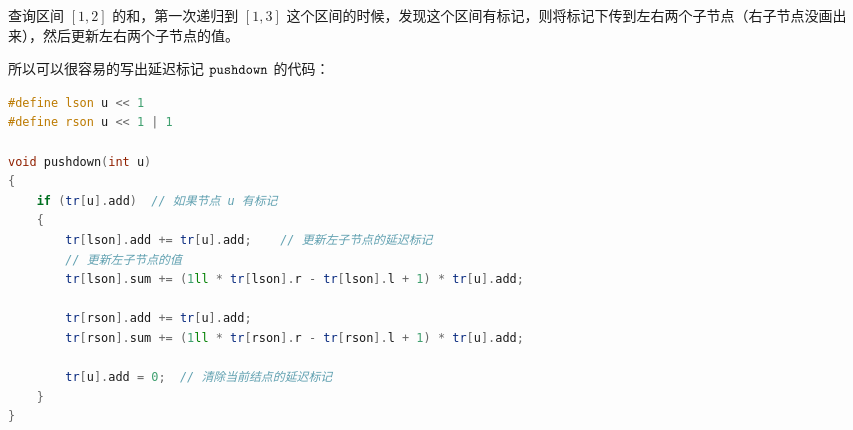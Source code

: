 查询区间 $[1, 2]$ 的和，第一次递归到 $[1, 3]$ 这个区间的时候，发现这个区间有标记，则将标记下传到左右两个子节点（右子节点没画出来），然后更新左右两个子节点的值。

所以可以很容易的写出延迟标记 $\tt pushdown$ 的代码：

\begin{lstlisting}[language=cpp]
#define lson u << 1
#define rson u << 1 | 1

void pushdown(int u)
{
    if (tr[u].add)  // 如果节点 u 有标记
    {
        tr[lson].add += tr[u].add;    // 更新左子节点的延迟标记
        // 更新左子节点的值
        tr[lson].sum += (1ll * tr[lson].r - tr[lson].l + 1) * tr[u].add; 
        
        tr[rson].add += tr[u].add;
        tr[rson].sum += (1ll * tr[rson].r - tr[rson].l + 1) * tr[u].add;
        
        tr[u].add = 0;  // 清除当前结点的延迟标记
    }
}
\end{lstlisting}